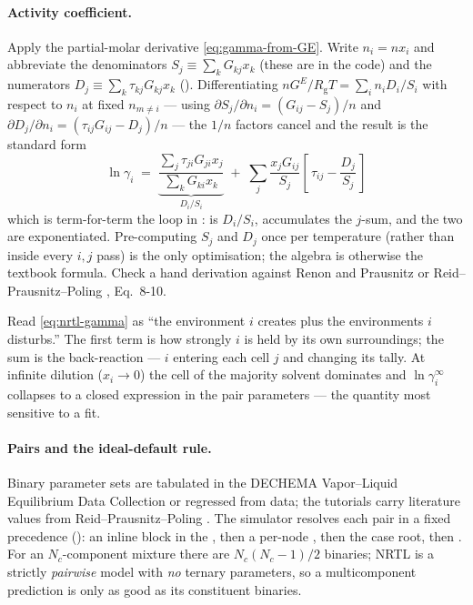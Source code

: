 \documentclass[11pt,a4paper]{article}
\newcommand{\Rgas}{R_{\!\mathrm{g}}}                %
\newcommand{\Gex}{G^{E}}
\begin{document}
\paragraph{Activity coefficient.}
Apply the partial-molar derivative \eqref{eq:gamma-from-GE}. Write
$n_i = n x_i$ and abbreviate the denominators
$S_j \equiv \sum_k G_{kj} x_k$ (these are  in the code) and
the numerators $D_j \equiv \sum_k \tau_{kj} G_{kj} x_k$
(). Differentiating
$n\Gex/\Rgas T = \sum_i n_i D_i/S_i$ with respect to $n_i$ at fixed
$n_{m\ne i}$ --- using $\partial S_j/\partial n_i = (G_{ij}-S_j)/n$ and
$\partial D_j/\partial n_i = (\tau_{ij}G_{ij}-D_j)/n$ --- the $1/n$
factors cancel and the result is the standard form
\begin{equation}
   \boxed{\;
   \ln \gamma_i \;=\;
   \underbrace{\frac{\displaystyle\sum_j \tau_{ji} G_{ji} x_j}
        {\displaystyle\sum_k G_{ki} x_k}}_{D_i/S_i}
   \;+\;
   \sum_j \frac{x_j G_{ij}}{\;S_j\;}
   \left[\,\tau_{ij} - \frac{D_j}{S_j}\,\right]
   \;}
   \label{eq:nrtl-gamma}
\end{equation}
which is term-for-term the loop in : 
is $D_i/S_i$,  accumulates the $j$-sum, and the two are
exponentiated. Pre-computing $S_j$ and $D_j$ once per temperature
(rather than inside every $i,j$ pass) is the only optimisation; the
algebra is otherwise the textbook formula. Check a hand derivation
against Renon and Prausnitz \cite{Renon} or
Reid--Prausnitz--Poling \cite{RPP}, Eq.~8-10.

\begin{intuition}
Read \eqref{eq:nrtl-gamma} as ``the environment $i$ creates plus the
environments $i$ disturbs.'' The first term is how strongly $i$ is held
by its own surroundings; the sum is the back-reaction --- $i$ entering
each cell $j$ and changing its tally. At infinite dilution
($x_i\to0$) the cell of the majority solvent dominates and
$\ln\gamma_i^\infty$ collapses to a closed expression in the pair
parameters --- the quantity most sensitive to a fit.
\end{intuition}

\paragraph{Pairs and the ideal-default rule.}
Binary parameter sets are tabulated in the DECHEMA Vapor--Liquid
Equilibrium Data Collection or regressed from data; the tutorials carry
literature values from Reid--Prausnitz--Poling \cite{RPP}. The
simulator resolves each pair in a fixed precedence
(): an inline  block in the
, then a per-node
, then the case root, then
. For an $N_c$-component mixture
there are $N_c(N_c-1)/2$ binaries; NRTL is a strictly \emph{pairwise}
model with \emph{no} ternary parameters, so a multicomponent
prediction is only as good as its constituent binaries.
\end{document}
